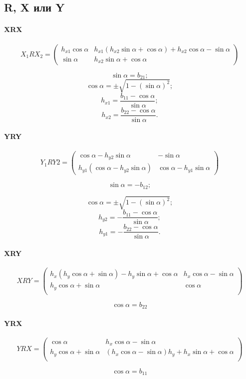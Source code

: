 \subsection{R, X или Y}

\paragraph{XRX}

$$X_1RX_2 = \begin{pmatrix}
	h_{x1} \cos\alpha & h_{x1} \left( h_{x2} \sin\alpha + \cos\alpha \right) + h_{x2} \cos\alpha - \sin\alpha \\
	\sin\alpha & h_{x2} \sin\alpha + \cos\alpha
\end{pmatrix}$$

$$\sin\alpha = b_{21};$$
$$\cos\alpha = \pm \sqrt{1 - (\sin\alpha)^2};$$
$$h_{x1} = \frac{b_{11} - \cos\alpha}{\sin\alpha};$$
$$h_{x2} = \frac{b_{22} - \cos\alpha}{\sin\alpha}.$$


\paragraph{YRY}

$$Y_1RY2 = \begin{pmatrix}
	\cos\alpha - h_{y2} \sin\alpha & -\sin\alpha \\
	h_{y1} \left( \cos\alpha - h_{y2} \sin\alpha \right) & \cos\alpha - h_{y1} \sin\alpha
\end{pmatrix}$$

$$\sin\alpha = - b_{12};$$

$$\cos\alpha = \pm \sqrt{1 - (\sin\alpha)^2};$$
$$h_{y2} = -\frac{b_{11} - \cos\alpha}{\sin\alpha};$$
$$h_{y1} = -\frac{b_{22} - \cos\alpha}{\sin\alpha}.$$


 
\paragraph{XRY}
$$XRY =
 \begin{pmatrix} h_x
  \left( h_y \cos\alpha + \sin\alpha \right) - h_y \sin\alpha + \cos\alpha &
 h_x \cos\alpha - \sin\alpha \\
h_y \cos\alpha + \sin\alpha & \cos\alpha \\
 \end{pmatrix} $$
 
$$\cos\alpha = b_{22}$$
 
\paragraph{YRX}
$$YRX =
 \begin{pmatrix} \cos\alpha &
 h_x \cos\alpha - \sin\alpha \\
h_y \cos\alpha + \sin\alpha & \left( h_x \cos\alpha - \sin\alpha \right) h_y + h_x \sin\alpha + \cos\alpha \\
 \end{pmatrix} $$

$$\cos\alpha = b_{11}$$


